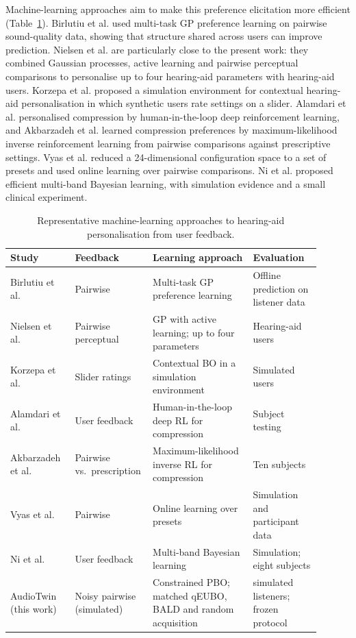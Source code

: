 \documentclass[preprint,12pt]{elsarticle}
\begin{document}
Machine-learning approaches aim to make this preference elicitation more efficient (Table~\ref{tab:prior}). Birlutiu et al. \cite{birlutiu2010} used multi-task GP preference learning on pairwise sound-quality data, showing that structure shared across users can improve prediction. Nielsen et al. \cite{nielsen2015} are particularly close to the present work: they combined Gaussian processes, active learning and pairwise perceptual comparisons to personalise up to four hearing-aid parameters with hearing-aid users. Korzepa et al. \cite{korzepa2020} proposed a simulation environment for contextual hearing-aid personalisation in which synthetic users rate settings on a slider. Alamdari et al. \cite{alamdari2020} personalised compression by human-in-the-loop deep reinforcement learning, and Akbarzadeh et al. \cite{akbarzadeh2022} learned compression preferences by maximum-likelihood inverse reinforcement learning from pairwise comparisons against prescriptive settings. Vyas et al. \cite{vyas2022} reduced a 24-dimensional configuration space to a set of presets and used online learning over pairwise comparisons. Ni et al. \cite{ni2024} proposed efficient multi-band Bayesian learning, with simulation evidence and a small clinical experiment.

\begin{table}[!htbp]
\centering
\caption{Representative machine-learning approaches to hearing-aid personalisation from user feedback.}
\label{tab:prior}
\small
\begin{tabular}{@{}>{\raggedright\arraybackslash}p{0.205\linewidth}>{\raggedright\arraybackslash}p{0.18\linewidth}>{\raggedright\arraybackslash}p{0.31\linewidth}>{\raggedright\arraybackslash}p{0.21\linewidth}@{}}
\toprule
Study & Feedback & Learning approach & Evaluation \\
\midrule
Birlutiu et al.~\cite{birlutiu2010} & Pairwise & Multi-task GP preference learning & Offline prediction on listener data \\
Nielsen et al.~\cite{nielsen2015} & Pairwise perceptual & GP with active learning; up to four parameters & Hearing-aid users \\
Korzepa et al.~\cite{korzepa2020} & Slider ratings & Contextual BO in a simulation environment & Simulated users \\
Alamdari et al.~\cite{alamdari2020} & User feedback & Human-in-the-loop deep RL for compression & Subject testing \\
Akbarzadeh et al.~\cite{akbarzadeh2022} & Pairwise vs.\ prescription & Maximum-likelihood inverse RL for compression & Ten subjects \\
Vyas et al.~\cite{vyas2022} & Pairwise & Online learning over presets & Simulation and participant data \\
Ni et al.~\cite{ni2024} & User feedback & Multi-band Bayesian learning & Simulation; eight subjects \\
AudioTwin (this work) & Noisy pairwise (simulated) & Constrained PBO; matched qEUBO, BALD and random acquisition & 128 simulated listeners; frozen protocol \\
\bottomrule
\end{tabular}
\end{table}
\end{document}
